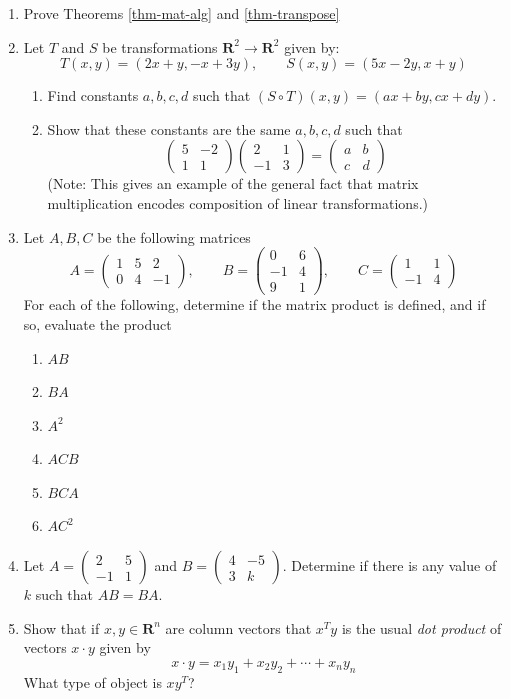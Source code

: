 \documentclass[12pt]{article}
\numberwithin{equation}{subsection}
\numberwithin{figure}{subsection}
\theoremstyle{note}
\begin{document}
\begin{enumerate}[label=\arabic*.]
	\item Prove Theorems \ref{thm-mat-alg} and \ref{thm-transpose} 
	\item Let $T$ and $S$ be transformations $\mathbf{R}^2\to\mathbf{R}^2$ given by: \[ T(x,y)=(2x+y, -x+3y), \qquad S(x,y)=(5x-2y, x+y)\]
	\begin{enumerate}
		\item Find constants $a,b,c,d$ such that $(S\circ T)(x,y)=(ax+by, cx+dy)$.
		\item Show that these constants are the same $a,b,c,d$ such that \[\begin{pmatrix} 5 & -2 \\ 1 & 1\end{pmatrix} \begin{pmatrix} 2 & 1 \\ -1 & 3\end{pmatrix}= \begin{pmatrix} a & b \\ c&d\end{pmatrix}\]
	(Note: This gives an example of the general fact that matrix multiplication encodes composition of linear transformations.)
	\end{enumerate}
	\item Let $A,B,C$ be the following matrices \[ A=\begin{pmatrix} 1 & 5 & 2 \\ 0 & 4 & -1 \end{pmatrix}, \qquad B=\begin{pmatrix} 0 & 6 \\ -1 & 4 \\ 9 & 1\end{pmatrix}, \qquad C=\begin{pmatrix} 1 & 1 \\ -1 & 4\end{pmatrix} \]
	For each of the following, determine if the matrix product is defined, and if so, evaluate the product
	\begin{enumerate}
		\item $AB$
		\item $BA$
		\item $A^2$
		\item $ACB$
		\item $BCA$
		\item $AC^2$	
	\end{enumerate}

	\item Let $A=\begin{pmatrix} 2 & 5 \\ -1 & 1 \end{pmatrix}$ and $B=\begin{pmatrix} 4 & -5 \\ 3 & k \end{pmatrix}$. Determine if there is any value of $k$ such that $AB=BA$. 
	\item Show that if $x,y\in \mathbf{R}^n$ are column vectors that $x^Ty$ is the usual \textit{dot product} of vectors $x\cdot y$ given by \[x\cdot y=x_1y_1+x_2y_2+\cdots+x_ny_n\] 
	What type of object is $xy^T$?
	

\end{enumerate}
\end{document}
